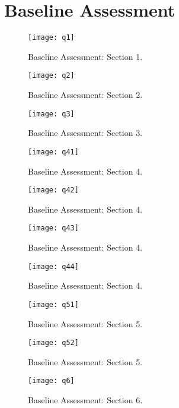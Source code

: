 
\chapter{Baseline Assessment}
\begin{figure}[h]
\centering
\texttt{[image: q1]}
\caption{Baseline Assessment: Section 1.}
\end{figure}

\begin{figure}[h]
\centering
\texttt{[image: q2]}
\caption{Baseline Assessment: Section 2.}
\end{figure}

\begin{figure}[h]
\centering
\texttt{[image: q3]}
\caption{Baseline Assessment: Section 3.}
\end{figure}

\begin{figure}[h]
\centering
\texttt{[image: q41]}
\caption{Baseline Assessment: Section 4.}
\end{figure}

\begin{figure}[h]
\centering
\texttt{[image: q42]}
\caption{Baseline Assessment: Section 4.}
\end{figure}

\begin{figure}[h]
\centering
\texttt{[image: q43]}
\caption{Baseline Assessment: Section 4.}
\end{figure}

\begin{figure}[h]
\centering
\texttt{[image: q44]}
\caption{Baseline Assessment: Section 4.}
\end{figure}

\begin{figure}[h]
\centering
\texttt{[image: q51]}
\caption{Baseline Assessment: Section 5.}
\end{figure}

\begin{figure}[h]
\centering
\texttt{[image: q52]}
\caption{Baseline Assessment: Section 5.}
\end{figure}

\begin{figure}[h]
\centering
\texttt{[image: q6]}
\caption{Baseline Assessment: Section 6.}
\end{figure}